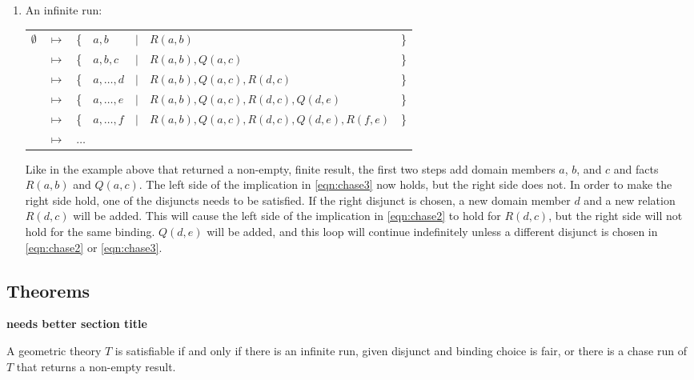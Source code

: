\begin{enumerate}
		\item An infinite run:

			\begin{tabular}{lllllll}
				$\emptyset$ & $\mapsto$ & \{ & $a,b$        & $|$ & $R(a,b)$                                 & \} \\
				{}          & $\mapsto$ & \{ & $a,b,c$      & $|$ & $R(a,b), Q(a,c)$                         & \} \\
				{}          & $\mapsto$ & \{ & $a,\ldots,d$ & $|$ & $R(a,b), Q(a,c), R(d,c)$                 & \} \\
				{}          & $\mapsto$ & \{ & $a,\ldots,e$ & $|$ & $R(a,b), Q(a,c), R(d,c), Q(d,e)$         & \} \\
				{}          & $\mapsto$ & \{ & $a,\ldots,f$ & $|$ & $R(a,b), Q(a,c), R(d,c), Q(d,e), R(f,e)$ & \} \\
				{}          & $\mapsto$ & \multicolumn{5}{l}{ $\ldots$ }
			\end{tabular}

			Like in the example above that returned a non-empty, finite result,
			the first two steps add domain members $a$, $b$, and $c$ and facts
			$R(a,b)$ and $Q(a,c)$. The left side of the implication in
			\eqref{eqn:chase3} now holds, but the right side does not. In order to
			make the right side hold, one of the disjuncts needs to be
			satisfied. If the right disjunct is chosen, a new domain member $d$
			and a new relation $R(d,c)$ will be added. This will cause the
			left side of the implication in \eqref{eqn:chase2} to hold for $R(d,c)$,
			but the right side will not hold for the same binding. $Q(d,e)$ will
			be added, and this loop will continue indefinitely unless a
			different disjunct is chosen in \eqref{eqn:chase2} or \eqref{eqn:chase3}.

		\end{enumerate}

	\subsection{Theorems}

		\textbf{ needs better section title }

		\begin{theorem}
			A geometric theory $T$ is satisfiable if and only if there is an
			infinite run, given disjunct and binding choice is fair, or there
			is a chase run of $T$ that returns a non-empty result.
		\end{theorem}

